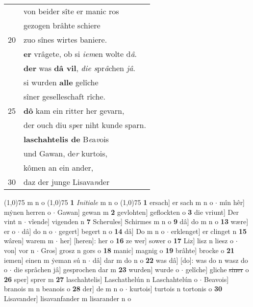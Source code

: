 \documentclass[8pt,a4paper,notitlepage]{article}
\begin{document}
\begin{table}[ht]
\begin{minipage}[t]{0.5\linewidth}
\begin{tabular}{rl}
 & von beider sîte er manic ros\\ 
 & gezogen brâhte schiere\\ 
20 & zuo sînes wirtes baniere.\\ 
 & \textbf{er} vrâgete, ob si \textit{iem}en wolte d\textit{â}.\\ 
 & \textbf{der} was \textbf{dâ vil}, \textit{die s}pr\textit{â}chen \textit{jâ}.\\ 
 & si wurden \textbf{alle} gelîche\\ 
 & sîner geselleschaft rîche.\\ 
25 & \textbf{dô} kam ein ritter her gevarn,\\ 
 & der ouch diu s\textit{p}er niht kunde sparn.\\ 
 & \textbf{laschahtelis de} B\textit{e}a\textit{v}ois\\ 
 & und Gawan, de\textit{r} kurtois,\\ 
 & kômen an ein ander,\\ 
30 & daz der junge Lisava\textit{n}der\\ 
\end{tabular}
\scriptsize
\line(1,0){75} \newline
m n o \newline
\line(1,0){75} \newline
\textbf{1} \textit{Initiale} m n o  \newline
\line(1,0){75} \newline
\textbf{1} ersach] er sach m n o  $\cdot$ mîn hêr] mẏnen herren o  $\cdot$ Gawan] gewan m \textbf{2} gevlohten] geflockten o \textbf{3} die vriunt] Der vint n  $\cdot$ vîende] vigenden n \textbf{7} Scherules] Schirmes m n o \textbf{9} dâ] do m n o \textbf{13} wære] er o  $\cdot$ dâ] do n o  $\cdot$ gegert] begert n o \textbf{14} dâ] Do m n o  $\cdot$ erklenget] er clinget n \textbf{15} wâren] warem m  $\cdot$ her] [heren]: her o \textbf{16} ze wer] sower o \textbf{17} Liz] lisz n liesz o  $\cdot$ von] vor n  $\cdot$ Gros] grosz n gors o \textbf{18} manic] magnig o \textbf{19} brâhte] brocke o \textbf{21} iemen] einen m ẏeman sú n  $\cdot$ dâ] dar m do n o \textbf{22} was dâ] [do]: was do n wasz do o  $\cdot$ die sprâchen jâ] gesprochen dar m \textbf{23} wurden] wurde o  $\cdot$ gelîche] gliche \sout{siner} o \textbf{26} sper] sprer m \textbf{27} laschahtelis] Laschathelún n Laschahtelún o  $\cdot$ Beavois] branois m n beanois o \textbf{28} der] de m n o  $\cdot$ kurtois] turtois n tortonis o \textbf{30} Lisavander] lisavanfander m lisarander n o \newline
\end{minipage}
\end{table}
\end{document}
